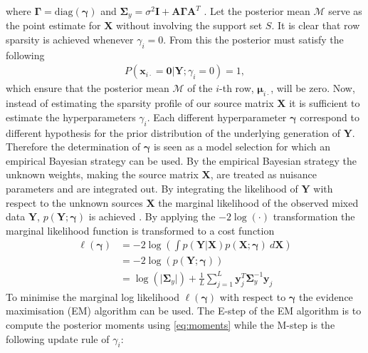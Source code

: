 where $\boldsymbol{\Gamma} = \text{diag}(\boldsymbol{\gamma})$ and $\boldsymbol{\Sigma}_y = \sigma^2 \mathbf{I} + \mathbf{A} \boldsymbol{\Gamma} \mathbf{A}^T$ . 
Let the posterior mean $\mathcal{M}$ serve as the point estimate for $\mathbf{X}$ without involving the support set $S$.
It is clear that row sparsity is achieved whenever $\gamma_i = 0$. 
From this the posterior must satisfy the following 
\begin{align*}
P(\mathbf{x}_{i \cdot} = \mathbf{0} \vert \mathbf{Y} ; \gamma_i = 0) = 1,
\end{align*}
which ensure that the posterior mean $\mathcal{M}$ of the $i$-th row, $\boldsymbol{\mu}_{i \cdot}$, will be zero. Now, instead of estimating the sparsity profile of our source matrix $\mathbf{X}$ it is sufficient to estimate the hyperparameters $\gamma_i$\cite[p. 147]{phd_wipf}.
Each different hyperparameter $\boldsymbol{\gamma}$ correspond to different hypothesis for the prior distribution of the underlying generation of $\mathbf{Y}$. Therefore the determination of $\boldsymbol{\gamma}$ is seen as a model selection for which an empirical Bayesian strategy can be used. 
By the empirical Bayesian strategy the unknown weights, making the source matrix $\textbf{X}$, are treated as nuisance parameters and are integrated out.
By integrating the likelihood of $\textbf{Y}$ with respect to the unknown sources $\mathbf{X}$ the marginal likelihood of the observed mixed data $\mathbf{Y}$, $p (\mathbf{Y} ; \boldsymbol{\gamma})$ is achieved \cite[p. 146]{phd_wipf}. 
By applying the $-2 \log (\cdot)$ transformation the marginal likelihood function is transformed to a cost function
\begin{align*}
\ell(\boldsymbol{\gamma}) &= -2 \log \left( \int p (\mathbf{Y}  \vert \mathbf{X}) p (\mathbf{X} ; \boldsymbol{\gamma}) \ d\mathbf{X} \right) \\
&= - 2 \log(p (\mathbf{Y} ; \boldsymbol{\gamma}))\\
&= \log ( \vert \boldsymbol{\Sigma}_y \vert) + \frac{1}{L} \sum_{j=1}^L \mathbf{y}_{j}^T \boldsymbol{\Sigma}_y ^{-1} \mathbf{y}_{j}
\end{align*}
To minimise the marginal log likelihood $\ell(\boldsymbol{\gamma})$ with respect to $\boldsymbol{\gamma}$ the evidence maximisation (EM)  algorithm can be used. 
The E-step of the EM algorithm is to compute the posterior moments using \eqref{eq:moments} while the M-step is the following update rule of $\gamma_i$:
